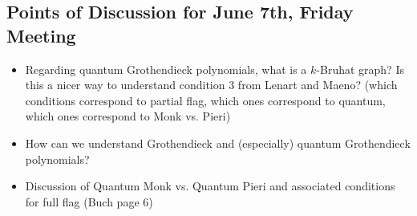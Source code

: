 \subsection{Points of Discussion for June 7th, Friday Meeting}

\begin{itemize}
    \item Regarding quantum Grothendieck polynomials, what is a $k$-Bruhat graph? Is this a nicer way to understand condition 3 from Lenart and Maeno? (which conditions correspond to partial flag, which ones correspond to quantum, which ones correspond to Monk vs. Pieri)
    \item How can we understand Grothendieck and (especially) quantum Grothendieck polynomials? 
    \item Discussion of Quantum Monk vs. Quantum Pieri and associated conditions for full flag (Buch page 6)

\end{itemize}






